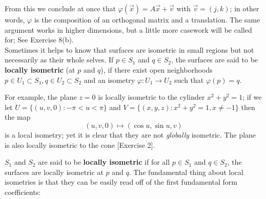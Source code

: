 \documentclass[leqno]{book}
\begin{document}
From this we conclude at once that $\varphi(\vec x)=A\vec x+\vec v$ with $\vec v=(j,k)$; in other words, $\varphi$ is the composition of an orthogonal matrix and a translation.  The same argument works in higher dimensions, but a little more casework will be called for; See Exercise 8(b).\\

\noindent Sometimes it helps to know that surfaces are isometric in small regions but not necessarily as their whole selves.  If $p\in S_1$ and $q\in S_2$, the surfaces are said to be \textbf{locally isometric} (at $p$ and $q$), if there exist open neighborhoods $p\in U_1\subset S_1,q\in U_2\subset S_2$ and an isometry $\varphi:U_1\to U_2$ such that $\varphi(p)=q$.

For example, the plane $z=0$ is locally isometric to the cylinder $x^2+y^2=1$; if we let $U=\{(u,v,0):-\pi<u<\pi\}$ and $V=\{(x,y,z):x^2+y^2=1,x\ne -1\}$ then the map
$$(u,v,0)\mapsto(\cos u,\sin u,v)$$
is a local isometry; yet it is clear that they are not \emph{globally} isometric.  The plane is also locally isometric to the cone [Exercise 2].

$S_1$ and $S_2$ are said to be \textbf{locally isometric} if for all $p\in S_1$ and $q\in S_2$, the surfaces are locally isometric at $p$ and $q$. %
The fundamental thing about local isometries is that they can be easily read off of the first fundamental form coefficients:\\
\end{document}
